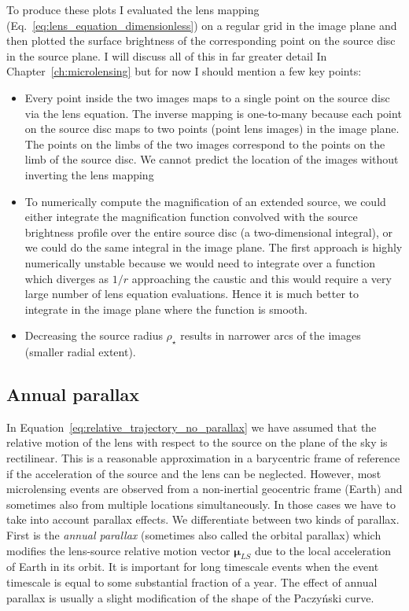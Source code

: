 \documentclass[12pt]{report}
\begin{document}
To produce these plots I evaluated the lens mapping
(Eq.~\ref{eq:lens_equation_dimensionless}) on a regular grid in the image plane
and then plotted the surface brightness of the corresponding point on the
source disc in the source plane. I will discuss all of this in far greater
detail In Chapter~\ref{ch:microlensing} but for now I should mention a few key
points:
\begin{itemize}
    \item Every point inside the two images maps to a single point on the source disc via
          the lens equation. The inverse mapping is one-to-many because each point on the
          source disc maps to two points (point lens images) in the image plane. The
          points on the limbs of the two images correspond to the points on the limb of
          the source disc. We cannot predict the location of the images without inverting
          the lens mapping
    \item To numerically compute the magnification of an extended source, we could either
          integrate the magnification function convolved with the source brightness
          profile over the entire source disc (a two-dimensional integral), or we could
          do the same integral in the image plane. The first approach is highly
          numerically unstable because we would need to integrate over a function which
          diverges as $1/r$ approaching the caustic and this would require a very large
          number of lens equation evaluations. Hence it is much better to integrate in
          the image plane where the function is smooth.
    \item Decreasing the source radius $\rho_\star$ results in narrower arcs of the
          images (smaller radial extent).
\end{itemize}

\subsection{Annual parallax}
\label{ssec:single_lens_parallax}
In Equation~\ref{eq:relative_trajectory_no_parallax} we have assumed that the
relative motion of the lens with respect to the source on the plane of the sky
is rectilinear.
This is a reasonable approximation in a barycentric frame of
reference if the acceleration of the source and the lens can be neglected.
However, most microlensing events are observed from a non-inertial geocentric
frame (Earth) and sometimes also from multiple locations simultaneously. In those
cases we have to take into account parallax effects.
We differentiate between two kinds of parallax. First is the \emph{annual
    parallax} (sometimes also called the orbital parallax) which modifies the
lens-source relative motion vector $\boldsymbol\mu_{LS}$ due to the local
acceleration of Earth in its orbit. It is important for long timescale events
when the event timescale is equal to some substantial fraction of a year. The
effect of annual parallax is usually a slight modification of the shape of the
Paczy\'nski curve.
\end{document}

